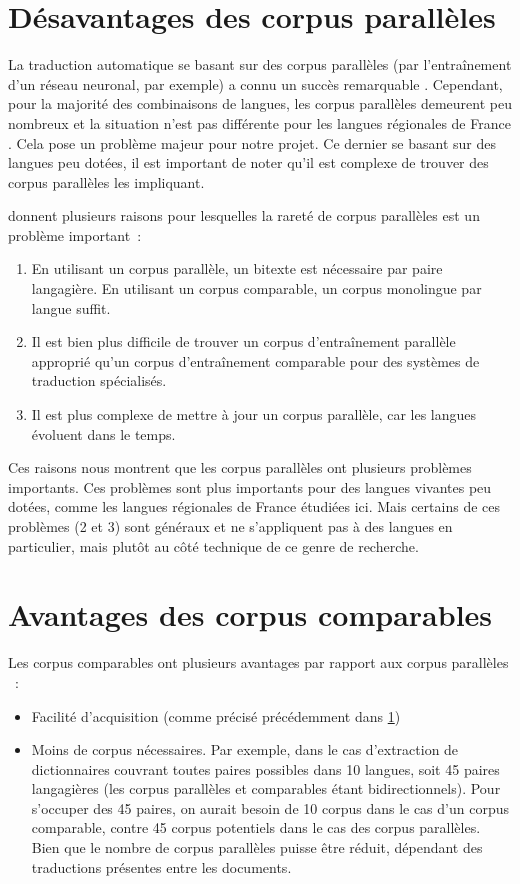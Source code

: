 \section{Désavantages des corpus parallèles} \label{désavantage}

La traduction automatique se basant sur des corpus parallèles (par l'entraînement d'un réseau neuronal,
par exemple) a connu un succès remarquable \citep{sharoff_2016}.
Cependant, pour la majorité des combinaisons de langues, les corpus parallèles demeurent peu nombreux
\citep{haddow_2022} et la situation n'est pas différente pour les langues régionales de France \citep{stosic_2024}.
Cela pose un problème majeur pour notre projet. Ce dernier se basant sur des langues peu dotées, il est
important de noter qu'il est complexe de trouver des corpus parallèles les impliquant.

\citet{sharoff_2016} donnent plusieurs raisons pour lesquelles la rareté de corpus parallèles est un
problème important~:
\begin{enumerate}
\item En utilisant un corpus parallèle, un \gls{bitexte} est nécessaire par paire langagière. En utilisant un
corpus comparable, un corpus monolingue par langue suffit.
\item Il est bien plus difficile de trouver un corpus d'entraînement parallèle approprié qu'un corpus
d'entraînement comparable pour des systèmes de traduction spécialisés.
\item Il est plus complexe de mettre à jour un corpus parallèle, car les langues évoluent dans le temps.
\end{enumerate}
Ces raisons nous montrent que les corpus parallèles ont plusieurs problèmes importants. Ces problèmes
sont plus importants pour des langues vivantes peu dotées, comme les langues régionales de France étudiées
ici. Mais certains de ces problèmes (2 et 3) sont généraux et ne s'appliquent pas à des langues en particulier,
mais plutôt au côté technique de ce genre de recherche.

\section{Avantages des corpus comparables}

Les corpus comparables ont plusieurs avantages par rapport aux corpus parallèles \citep{sharoff_2013a}~:
\begin{itemize}
\item Facilité d'acquisition (comme précisé précédemment dans \ref{désavantage})
\item Moins de corpus nécessaires. Par exemple, dans le cas d'extraction de dictionnaires couvrant toutes paires
possibles dans 10 langues, soit 45 paires langagières (les corpus parallèles et comparables étant
bidirectionnels). Pour s'occuper des 45 paires, on aurait besoin de 10 corpus dans le cas d'un corpus
comparable, contre 45 corpus potentiels dans le cas des corpus parallèles. Bien que le nombre de corpus
parallèles puisse être réduit, dépendant des traductions présentes entre les documents.
\end{itemize}

